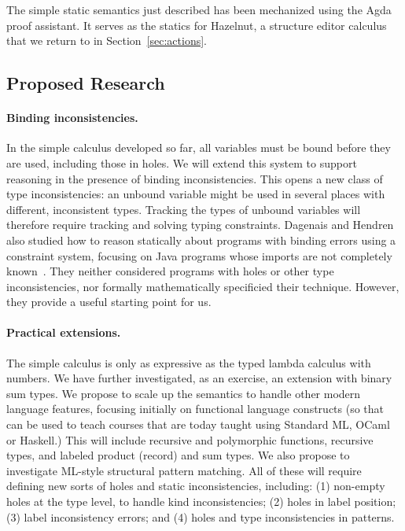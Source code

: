 The simple static semantics just described has been mechanized using the Agda proof assistant. It serves as the statics for Hazelnut, a structure editor calculus that we return to in Section~\ref{sec:actions}.

\subsection{Proposed Research}

\paragraph{Binding inconsistencies.} In the simple calculus developed so far,
    all variables must be bound before they are used,
    including those in holes. We will extend this system to support reasoning
    in the presence of binding inconsistencies. This 
    opens a new class of type inconsistencies: an unbound variable
    might be used in several places with different, inconsistent types. Tracking
    the types of unbound variables will therefore require tracking and solving typing constraints.  Dagenais and
    Hendren also studied how to reason statically about programs
    with binding errors using a constraint system, focusing on
    Java programs whose imports are not completely known~\cite{DBLP:conf/oopsla/DagenaisH08}. They neither
    considered programs with holes or other type inconsistencies,
    nor formally mathematically specificied their
    technique. However, they provide a useful starting point for us.

\paragraph{Practical extensions.} The simple calculus
    is only as expressive as the typed lambda calculus with numbers. We have further investigated,
    as an exercise, an extension with binary sum
    types. We propose to scale up the semantics to handle other modern language
    features, focusing initially on functional language
    constructs (so that \HazelEnv can be used to teach courses that
    are today taught using Standard ML, OCaml or Haskell.) This will include recursive and
    polymorphic functions, recursive types, and labeled product (record) and sum types.
    We also propose to investigate ML-style structural pattern
    matching. All of these will require defining new sorts of holes and static
    inconsistencies, including: (1) non-empty holes at the type level, to handle
    kind inconsistencies; (2) holes in label position; (3) label inconsistency
    errors; and (4) holes and type inconsistencies in patterns. 

